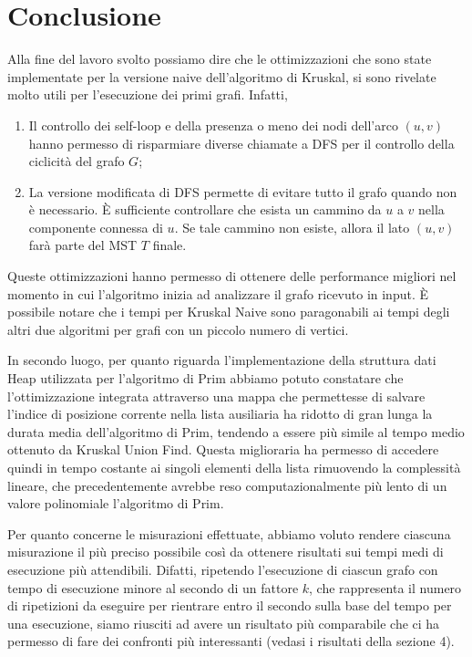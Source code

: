 \section{Conclusione}

Alla fine del lavoro svolto possiamo dire che le ottimizzazioni che sono state implementate per la versione naive dell'algoritmo di Kruskal, si sono 
rivelate molto utili per l'esecuzione dei primi grafi. Infatti,
\begin{enumerate}
    \item Il controllo dei self-loop e della presenza o meno dei nodi dell'arco $(u, v)$ hanno permesso di risparmiare diverse chiamate a DFS per il 
    controllo della ciclicità del grafo $G$;
    \item La versione modificata di DFS permette di evitare tutto il grafo quando non è necessario. È sufficiente controllare che esista un cammino 
    da $u$ a $v$ nella componente connessa di $u$. Se tale cammino non esiste, allora il lato $(u, v)$ farà parte del MST $T$ finale.
\end{enumerate}
Queste ottimizzazioni hanno permesso di ottenere delle performance migliori nel momento in cui l'algoritmo inizia ad analizzare il grafo ricevuto in 
input. È possibile notare che i tempi per Kruskal Naive sono paragonabili ai tempi degli altri due algoritmi per grafi con un piccolo numero di vertici.



In secondo luogo, per quanto riguarda l'implementazione della struttura dati Heap utilizzata per l'algoritmo di Prim abbiamo potuto constatare che l'ottimizzazione integrata attraverso una mappa che permettesse di salvare l'indice di posizione corrente nella lista ausiliaria ha ridotto di gran lunga la durata media dell'algoritmo di Prim, tendendo a essere più simile al tempo medio ottenuto da Kruskal Union Find. Questa miglioraria ha permesso di accedere quindi in tempo costante ai singoli elementi della lista rimuovendo la complessità lineare, che precedentemente avrebbe reso computazionalmente più lento di un valore polinomiale l'algoritmo di Prim.


Per quanto concerne le misurazioni effettuate, abbiamo voluto rendere ciascuna misurazione il più preciso possibile così da ottenere risultati sui tempi medi di esecuzione più attendibili. Difatti, ripetendo l'esecuzione di ciascun grafo con tempo di esecuzione minore al secondo di un fattore \(k\), che rappresenta il numero di ripetizioni da eseguire per rientrare entro il secondo sulla base del tempo per una esecuzione, siamo riusciti ad avere un risultato più comparabile che ci ha permesso di fare dei confronti più interessanti (vedasi i risultati della sezione 4). 


